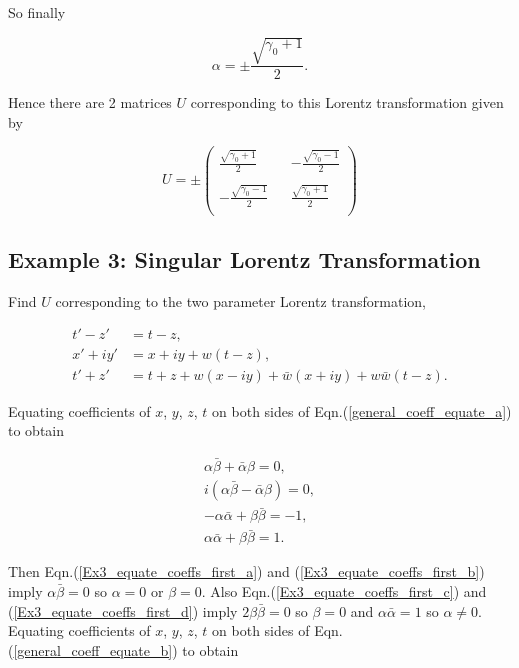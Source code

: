 \noindent So finally

\begin{equation*}
\alpha = \pm \frac{\sqrt{\gamma_0 + 1}}{2}.
\end{equation*}

\noindent Hence there are 2 matrices $U$ corresponding to this Lorentz transformation given by

\begin{equation*}
U = \pm
\left(
\begin{array}{ccc}
\frac{\sqrt{\gamma_0 + 1}}{2}   & & -\frac{\sqrt{\gamma_0 - 1}}{2} \\
 & & \\
- \frac{\sqrt{\gamma_0 - 1}}{2} & &  \frac{\sqrt{\gamma_0 + 1}}{2}  \\
\end{array}
\right)
\end{equation*}

\subsection{Example 3: Singular Lorentz Transformation}\label{Special_Linear_Matrices_Example_3}

\noindent Find $U$ corresponding to the two parameter Lorentz transformation,

\begin{align*}
t'-z' & = t-z, \\
x'+iy' & = x + iy + w(t-z), \\
t'+z' & = t+z + w(x-iy) + \bar{w} (x + iy) + w \bar{w} (t-z).
\end{align*}

\noindent Equating coefficients of $x$, $y$, $z$, $t$ on both sides of Eqn.(\ref{general_coeff_equate_a}) to obtain

\begin{subequations}
\begin{gather}\label{Ex3_equate_coeffs_first_a}
\alpha \bar{\beta} + \bar{\alpha} \beta = 0, \\\label{Ex3_equate_coeffs_first_b}
i (\alpha \bar{\beta} - \bar{\alpha} \beta) = 0, \\\label{Ex3_equate_coeffs_first_c}
-\alpha \bar{\alpha} + \beta \bar{\beta} = -1, \\\label{Ex3_equate_coeffs_first_d}
\alpha \bar{\alpha} + \beta \bar{\beta} = 1. 
\end{gather}
\end{subequations}

\noindent Then Eqn.(\ref{Ex3_equate_coeffs_first_a}) and (\ref{Ex3_equate_coeffs_first_b}) imply $\alpha \bar{\beta} = 0$ so $\alpha = 0$ or $\beta = 0$. Also Eqn.(\ref{Ex3_equate_coeffs_first_c}) and (\ref{Ex3_equate_coeffs_first_d}) imply $2\beta\bar{\beta} = 0$ so $\beta = 0$ and $\alpha \bar{\alpha} = 1$ so $\alpha \neq 0$. Equating coefficients of $x$, $y$, $z$, $t$ on both sides of Eqn.(\ref{general_coeff_equate_b}) to obtain

